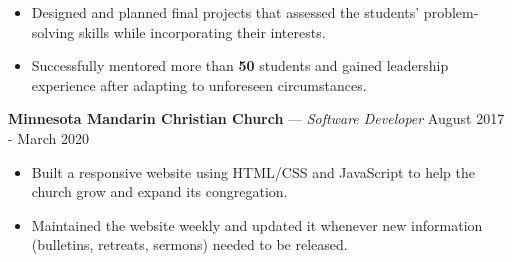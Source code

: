 \documentclass[11pt]{res}
\begin{document}
\begin{footnotesize}
\begin{resume}
\begin{itemize}[leftmargin=6.25mm]
\vspace{1.30mm}
\item Designed and planned final projects that assessed the students' problem-solving skills while incorporating their interests.
\vspace{1.30mm}
\item Successfully mentored more than \textbf{50} students and gained leadership experience after adapting to unforeseen circumstances. 
\end{itemize}
\vspace{-2.5mm}
\textbf{Minnesota Mandarin Christian Church} — {\sl Software Developer} \hfill August 2017 - March 2020\vspace{-4.5mm}
\begin{itemize}[leftmargin=6.25mm] \itemsep -2pt 
\item Built a responsive website using HTML/CSS and JavaScript to help the church grow and expand its congregation.
\vspace{1.30mm}
\item Maintained the website weekly and updated it whenever new information (bulletins, retreats, sermons) needed to be released. 
\end{itemize}
\vspace{-2mm}

\end{resume}
\end{footnotesize}
\end{document}
